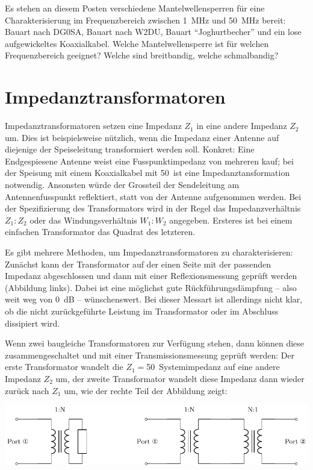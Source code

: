 \documentclass[a4paper,11pt,parskip=half,headings=small,DIV=11,notitlepage,abstract=on]{scrartcl}
\begin{document}
Es stehen an diesem Posten verschiedene Mantelwellensperren für eine
Charakterisierung im Frequenzbereich zwischen 1~MHz und 50~MHz bereit: Bauart
nach DG0SA, Bauart nach W2DU, Bauart ``Joghurtbecher'' und ein lose
aufgewickeltes Koaxialkabel. Welche Mantelwellensperre ist für welchen
Frequenzbereich geeignet? Welche sind breitbandig, welche schmalbandig?

\section{Impedanztransformatoren}
Impedanztransformatoren setzen eine Impedanz $Z_1$ in eine andere Impedanz $Z_2$ um.
Dies ist beispielsweise nützlich, wenn die Impedanz einer Antenne auf diejenige
der Speiseleitung transformiert werden soll. Konkret: Eine Endgespiesene Antenne
weist eine Fusspunktimpedanz von mehreren k\Ohm auf; bei der Speisung mit einem
Koaxialkabel mit 50~\Ohm ist eine Impedanztansformation notwendig. Ansonsten würde
der Grossteil der Sendeleitung am Antennenfusspunkt reflektiert, statt von der
Antenne aufgenommen werden. Bei der Spezifizierung des Transformators wird in der
Regel das Impedanzverhältnis $Z_1:Z_2$ oder das Windungsverhältnis $W_1:W_2$ angegeben.
Ersteres ist bei einem einfachen Transformator das Quadrat des letzteren.

Es gibt mehrere Methoden, um Impedanztransformatoren zu charakterisieren: Zunächst
kann der Transformator auf der einen Seite mit der passenden Impedanz abgeschlossen
und dann mit einer Reflexionsmessung geprüft werden (Abbildung links). Dabei ist eine
möglichst gute Rückführungsdämpfung -- also weit weg von 0~dB -- wünschenswert. Bei
dieser Messart ist allerdings nicht klar, ob die nicht zurückgeführte Leistung im
Transformator oder im Abschluss dissipiert wird.

Wenn zwei baugleiche Transformatoren zur Verfügung stehen, dann können diese
zusammengeschaltet und mit einer Transmissionsmessung geprüft werden: Der erste
Transformator wandelt die $Z_1=$50~\Ohm Systemimpedanz auf eine andere Impedanz
$Z_2$ um, der zweite Transformator wandelt diese Impedanz dann wieder zurück
nach $Z_1$ um, wie der rechte Teil der Abbildung zeigt:

\includegraphics[width=\textwidth]{../skript/figures/transformer/transformer.pdf}\hfill
\end{document}
